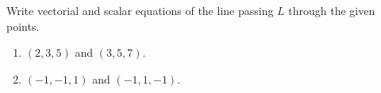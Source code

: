 Write vectorial and scalar equations of the line passing $L$ through the given points.

\begin{enumerate}
\item $(2,3,5)$ and $(3,5,7)$.


\item $(-1,-1,1)$ and $(-1,1,-1)$.

\end{enumerate}